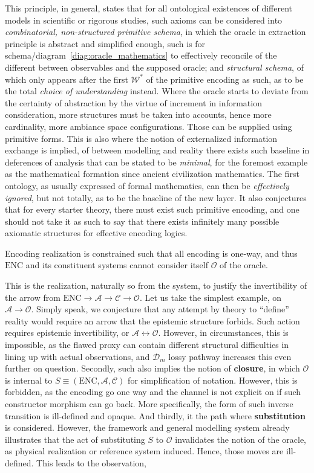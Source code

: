 This principle, in general, states that for all ontological existences of different models in scientific or rigorous studies, such axioms can be considered into \textit{combinatorial, non-structured primitive schema}, in which the oracle in extraction principle is abstract and simplified enough, such is for schema/diagram~\ref{diag:oracle_mathematics} to effectively reconcile of the different between observables and the supposed oracle; and \textit{structural schema}, of which only appears after the first $\mathcal{W}^{*}$ of the primitive encoding as such, as to be the total \textit{choice of understanding} instead. Where the oracle starts to deviate from the certainty of abstraction by the virtue of increment in information consideration, more structures must be taken into accounts, hence more cardinality, more ambiance space configurations. Those can be supplied using primitive forms. This is also where the notion of externalized information exchange is implied, of between modelling and reality there exists such baseline in deferences of analysis that can be stated to be \textit{minimal}, for the foremost example as the mathematical formation since ancient civilization mathematics. The first ontology, as usually expressed of formal mathematics, can then be \textit{effectively ignored}, but not totally, as to be the baseline of the new layer. It also conjectures that for every starter theory, there must exist such primitive encoding, and one should not take it as such to say that there exists infinitely many possible axiomatic structures for effective encoding logics. 
\begin{conjecture}
	Encoding realization is constrained such that all encoding is one-way, and thus $\mathrm{ENC}$ and its constituent systems cannot consider itself $\mathcal{O}$ of the oracle. 
\end{conjecture}
This is the realization, naturally so from the system, to justify the invertibility of the arrow from $\mathrm{ENC}\to\mathcal{A}\to\mathcal{C}\to\mathcal{O}$. Let us take the simplest example, on $\mathcal{A}\to\mathcal{O}$. Simply speak, we conjecture that any attempt by theory to “define” reality would require an arrow that the epistemic structure forbids. Such action requires epistemic invertibility, or $\mathcal{A}\leftrightarrow \mathcal{O}$. However, in circumstances, this is impossible, as the flawed proxy can contain different structural difficulties in lining up with actual observations, and $\mathcal{D}_{m}$ lossy pathway increases this even further on question. Secondly, such also implies the notion of \textbf{closure}, in which $\mathcal{O}$ is internal to $S\equiv(\mathrm{ENC},\mathcal{A},\mathcal{C})$ for simplification of notation. However, this is forbidden, as the encoding go one way and the channel is not explicit on if such constructor morphism can go back. More specifically, the form of such inverse transition is ill-defined and opaque. And thirdly, it the path where \textbf{substitution} is considered. However, the framework and general modelling system already illustrates that the act of substituting $S$ to $\mathcal{O}$ invalidates the notion of the oracle, as physical realization or reference system induced. Hence, those moves are ill-defined. This leads to the observation,
